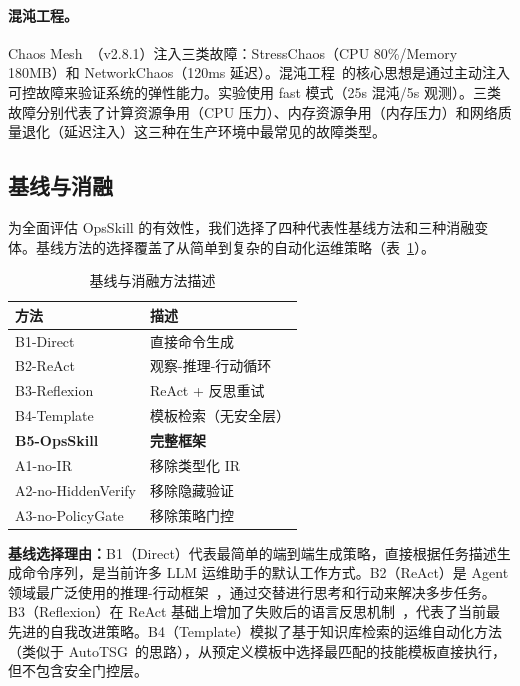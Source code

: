 \documentclass[11pt,a4paper]{ctexart}
\begin{document}
\paragraph{混沌工程。}
Chaos Mesh~\cite{chaosmesh2021}（v2.8.1）注入三类故障：StressChaos（CPU 80\%/Memory 180MB）和 NetworkChaos（120ms 延迟）。混沌工程~\cite{basiri2016chaos}的核心思想是通过主动注入可控故障来验证系统的弹性能力。实验使用 fast 模式（25s 混沌/5s 观测）。三类故障分别代表了计算资源争用（CPU 压力）、内存资源争用（内存压力）和网络质量退化（延迟注入）这三种在生产环境中最常见的故障类型。

\subsection{基线与消融}

为全面评估 OpsSkill 的有效性，我们选择了四种代表性基线方法和三种消融变体。基线方法的选择覆盖了从简单到复杂的自动化运维策略（表~\ref{tab:methods}）。

\begin{table}[H]
\centering
\caption{基线与消融方法描述}
\label{tab:methods}
\small
\begin{tabular}{ll}
\toprule
\textbf{方法} & \textbf{描述} \\
\midrule
B1-Direct   & 直接命令生成 \\
B2-ReAct    & 观察-推理-行动循环~\cite{yao2023react} \\
B3-Reflexion & ReAct + 反思重试~\cite{shinn2023reflexion} \\
B4-Template  & 模板检索（无安全层）\\
\textbf{B5-OpsSkill} & \textbf{完整框架} \\
\midrule
A1-no-IR         & 移除类型化 IR \\
A2-no-HiddenVerify & 移除隐藏验证 \\
A3-no-PolicyGate   & 移除策略门控 \\
\bottomrule
\end{tabular}
\end{table}

\noindent\textbf{基线选择理由：}B1（Direct）代表最简单的端到端生成策略，直接根据任务描述生成命令序列，是当前许多 LLM 运维助手的默认工作方式。B2（ReAct）是 Agent 领域最广泛使用的推理-行动框架~\cite{yao2023react}，通过交替进行思考和行动来解决多步任务。B3（Reflexion）在 ReAct 基础上增加了失败后的语言反思机制~\cite{shinn2023reflexion}，代表了当前最先进的自我改进策略。B4（Template）模拟了基于知识库检索的运维自动化方法（类似于 AutoTSG~\cite{shetty2022autotsg}的思路），从预定义模板中选择最匹配的技能模板直接执行，但不包含安全门控层。
\end{document}
